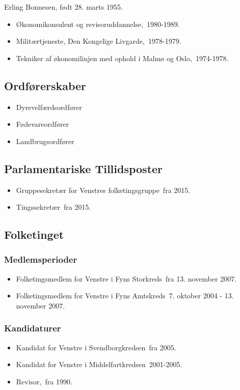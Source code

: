 \documentclass[11pt, a4paper]{awesome-cv}
\begin{document}
\makecvheader[R]
\makelettertitle
\begin{cvletter}
Erling Bonnesen, født 28. marts 1955.

\begin{itemize}
\item Økonomikonsulent og revisoruddannelse, 1980-1989.
\item Militærtjeneste, Den Kongelige Livgarde, 1978-1979.
\item Tekniker af økonomilinjen med ophold i Malmø og Oslo, 1974-1978.
\end{itemize}
\subsection*{Ordførerskaber}
\begin{itemize}
\item Dyrevelfærdsordfører
\item Fødevareordfører
\item Landbrugsordfører
\end{itemize}
\subsection*{Parlamentariske Tillidsposter}
\begin{itemize}
\item Gruppesekretær for Venstres folketingsgruppe fra 2015.
\item Tingssekretær fra 2015.
\end{itemize}
\subsection*{Folketinget}
\subsubsection*{Medlemsperioder}
\begin{itemize}
\item Folketingsmedlem for Venstre i Fyns Storkreds fra 13. november 2007.
\item Folketingsmedlem for Venstre i Fyns Amtskreds 7. oktober 2004 - 13. november 2007.
\end{itemize}
\subsubsection*{Kandidaturer}
\begin{itemize}
\item Kandidat for Venstre i Svendborgkredsen fra 2005.
\item Kandidat for Venstre i Middelfartkredsen 2001-2005.
\end{itemize}
\begin{itemize}
\item Revisor, fra 1990.
\end{itemize}
\end{cvletter}
\end{document}
